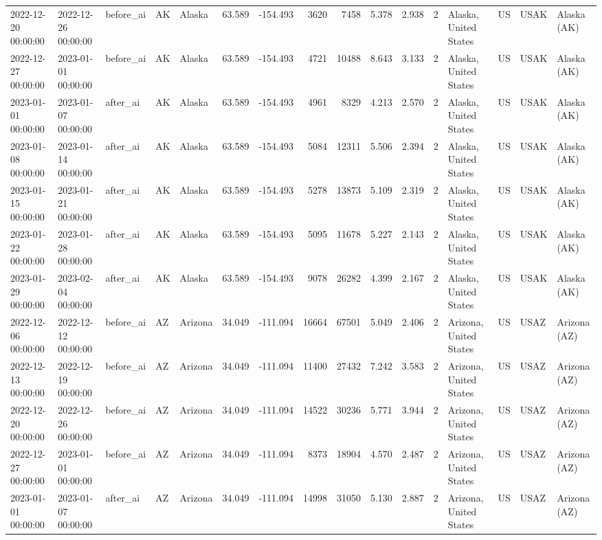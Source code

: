 \begin{tabular}{lllllrrrrrrlllll}
2022-12-20 00:00:00 & 2022-12-26 00:00:00 & before\_ai & AK & Alaska & 63.589 & -154.493 & 3620 & 7458 & 5.378 & 2.938 & 2 & Alaska, United States & US & USAK & Alaska (AK) \\
2022-12-27 00:00:00 & 2023-01-01 00:00:00 & before\_ai & AK & Alaska & 63.589 & -154.493 & 4721 & 10488 & 8.643 & 3.133 & 2 & Alaska, United States & US & USAK & Alaska (AK) \\
2023-01-01 00:00:00 & 2023-01-07 00:00:00 & after\_ai & AK & Alaska & 63.589 & -154.493 & 4961 & 8329 & 4.213 & 2.570 & 2 & Alaska, United States & US & USAK & Alaska (AK) \\
2023-01-08 00:00:00 & 2023-01-14 00:00:00 & after\_ai & AK & Alaska & 63.589 & -154.493 & 5084 & 12311 & 5.506 & 2.394 & 2 & Alaska, United States & US & USAK & Alaska (AK) \\
2023-01-15 00:00:00 & 2023-01-21 00:00:00 & after\_ai & AK & Alaska & 63.589 & -154.493 & 5278 & 13873 & 5.109 & 2.319 & 2 & Alaska, United States & US & USAK & Alaska (AK) \\
2023-01-22 00:00:00 & 2023-01-28 00:00:00 & after\_ai & AK & Alaska & 63.589 & -154.493 & 5095 & 11678 & 5.227 & 2.143 & 2 & Alaska, United States & US & USAK & Alaska (AK) \\
2023-01-29 00:00:00 & 2023-02-04 00:00:00 & after\_ai & AK & Alaska & 63.589 & -154.493 & 9078 & 26282 & 4.399 & 2.167 & 2 & Alaska, United States & US & USAK & Alaska (AK) \\
2022-12-06 00:00:00 & 2022-12-12 00:00:00 & before\_ai & AZ & Arizona & 34.049 & -111.094 & 16664 & 67501 & 5.049 & 2.406 & 2 & Arizona, United States & US & USAZ & Arizona (AZ) \\
2022-12-13 00:00:00 & 2022-12-19 00:00:00 & before\_ai & AZ & Arizona & 34.049 & -111.094 & 11400 & 27432 & 7.242 & 3.583 & 2 & Arizona, United States & US & USAZ & Arizona (AZ) \\
2022-12-20 00:00:00 & 2022-12-26 00:00:00 & before\_ai & AZ & Arizona & 34.049 & -111.094 & 14522 & 30236 & 5.771 & 3.944 & 2 & Arizona, United States & US & USAZ & Arizona (AZ) \\
2022-12-27 00:00:00 & 2023-01-01 00:00:00 & before\_ai & AZ & Arizona & 34.049 & -111.094 & 8373 & 18904 & 4.570 & 2.487 & 2 & Arizona, United States & US & USAZ & Arizona (AZ) \\
2023-01-01 00:00:00 & 2023-01-07 00:00:00 & after\_ai & AZ & Arizona & 34.049 & -111.094 & 14998 & 31050 & 5.130 & 2.887 & 2 & Arizona, United States & US & USAZ & Arizona (AZ) \\

\end{tabular}
